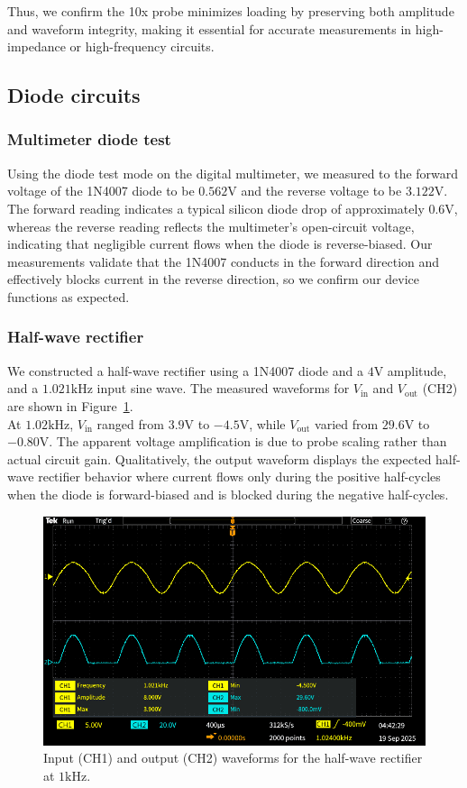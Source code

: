 \documentclass{article}
\begin{document}
\noindent Thus, we confirm the 10x probe minimizes loading by preserving both
amplitude and waveform integrity, making it essential for accurate measurements
in high-impedance or high-frequency circuits.

\subsection{Diode circuits}

\subsubsection{Multimeter diode test}

Using the diode test mode on the digital multimeter, we measured to the forward
voltage of the 1N4007 diode to be $0.562\si{\volt}$ and the reverse voltage to 
be $3.122\si{\volt}$. The forward reading indicates a typical silicon diode drop
of approximately $0.6\si{\volt}$, whereas the reverse reading reflects the
multimeter's open-circuit voltage, indicating that negligible current flows when
the diode is reverse-biased. Our measurements validate that the 1N4007 conducts in
the forward direction and effectively blocks current in the reverse direction, so
we confirm our device functions as expected.


\subsubsection{Half-wave rectifier}

We constructed a half-wave rectifier using a 1N4007 diode and a $4\si{\volt}$
amplitude, and a $1.021\si{\kilo\hertz}$ input sine wave. The measured waveforms for
$V_{\text{in}}$ and $V_{\text{out}}$ (CH2) are shown in Figure~\ref{fig:half_wave}.\\

\noindent At $1.02\si{\kilo\hertz}$, $V_{\text{in}}$ ranged from $3.9\si{\volt}$ to 
$-4.5\si{\volt}$, while $V_{\text{out}}$ varied from $29.6\si{\volt}$ to $-0.80\si{\volt}$. 
The apparent voltage amplification is due to probe scaling rather than
actual circuit gain. Qualitatively, the output waveform displays the expected
half-wave rectifier behavior where current flows only during the positive 
half-cycles when the diode is forward-biased and is blocked during the negative
half-cycles.\\

\begin{figure}[H]
    \centering
    \includegraphics[width=0.65\linewidth]{4.2.b.png}
    \caption{Input (CH1) and output (CH2) waveforms for the half-wave rectifier at $1\si{\kilo\hertz}$.}
    \label{fig:half_wave}
\end{figure}
\end{document}
